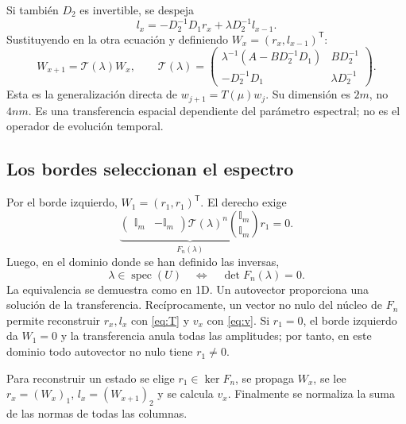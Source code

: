 \documentclass[11pt,a4paper]{article}
\newcommand{\Id}{\mathbb I}
\newcommand{\spec}{\operatorname{spec}}
\newcommand{\T}{\mathcal T}
\numberwithin{equation}{section}
\begin{document}
Si también $D_2$ es invertible, se despeja
\begin{equation}
 l_x=-D_2^{-1}D_1r_x+\lambda D_2^{-1}l_{x-1}.
\end{equation}
Sustituyendo en la otra ecuación y definiendo $W_x=(r_x,l_{x-1})^{\mathsf T}$:
\begin{equation}\label{eq:T}
 \boxed{W_{x+1}=\T(\lambda)W_x,\qquad
 \T(\lambda)=\begin{pmatrix}
 \lambda^{-1}(A-BD_2^{-1}D_1)&BD_2^{-1}\\
 -D_2^{-1}D_1&\lambda D_2^{-1}
 \end{pmatrix}.}
\end{equation}
Esta es la generalización directa de $w_{j+1}=T(\mu)w_j$. Su dimensión es $2m$, no $4nm$. Es una transferencia espacial dependiente del parámetro espectral; no es el operador de evolución temporal.

\subsection{Los bordes seleccionan el espectro}
Por el borde izquierdo, $W_1=(r_1,r_1)^{\mathsf T}$. El derecho exige
\begin{equation}
 \underbrace{\begin{pmatrix}\Id_m&-\Id_m\end{pmatrix}
 \T(\lambda)^n\binom{\Id_m}{\Id_m}}_{F_n(\lambda)}r_1=0.
\end{equation}
Luego, en el dominio donde se han definido las inversas,
\begin{equation}\label{eq:secular}
 \boxed{\lambda\in\spec(U)\quad\Longleftrightarrow\quad
 \det F_n(\lambda)=0.}
\end{equation}
La equivalencia se demuestra como en 1D. Un autovector proporciona una solución de la transferencia. Recíprocamente, un vector no nulo del núcleo de $F_n$ permite reconstruir $r_x,l_x$ con \eqref{eq:T} y $v_x$ con \eqref{eq:v}. Si $r_1=0$, el borde izquierdo da $W_1=0$ y la transferencia anula todas las amplitudes; por tanto, en este dominio todo autovector no nulo tiene $r_1\ne0$.

Para reconstruir un estado se elige $r_1\in\ker F_n$, se propaga $W_x$, se lee $r_x=(W_x)_1$, $l_x=(W_{x+1})_2$ y se calcula $v_x$. Finalmente se normaliza la suma de las normas de todas las columnas.
\end{document}
